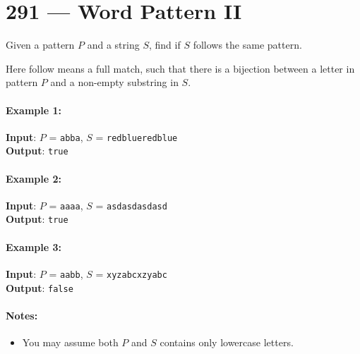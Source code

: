 \section{291 --- Word Pattern II}
Given a pattern $P$ and a string $S$, find if $S$ follows the same pattern.
\par
Here follow means a full match, such that there is a bijection between a letter in pattern $P$ and a non-empty substring in $S$.

\paragraph{Example 1:}
\begin{flushleft}
\textbf{Input}: $P$ = \texttt{abba}, $S$ = \texttt{redblueredblue}
\\
\textbf{Output}: \texttt{true}
\end{flushleft}

\paragraph{Example 2:}
\begin{flushleft}
\textbf{Input}: $P$ = \texttt{aaaa}, $S$ = \texttt{asdasdasdasd}
\\
\textbf{Output}: \texttt{true}
\end{flushleft}

\paragraph{Example 3:}
\begin{flushleft}
\textbf{Input}: $P$ = \texttt{aabb}, $S$ = \texttt{xyzabcxzyabc}
\\
\textbf{Output}: \texttt{false}
\end{flushleft}

\paragraph{Notes:}
\begin{itemize}
\item You may assume both $P$ and $S$ contains only lowercase letters.
\end{itemize}

